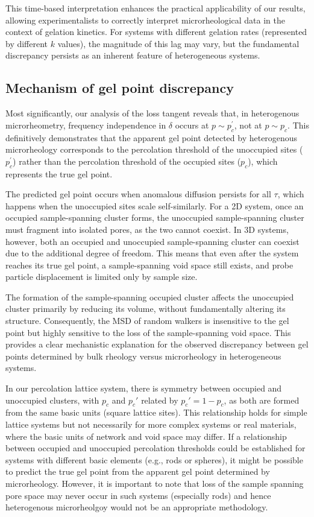 \documentclass[%
 aip,
 amsmath,amssymb,
reprint, onecolumn %
]{revtex4-1}
\begin{document}
This time-based interpretation enhances the practical applicability of our results, allowing experimentalists to correctly interpret microrheological data in the context of gelation kinetics. For systems with different gelation rates (represented by different $k$ values), the magnitude of this lag may vary, but the fundamental discrepancy persists as an inherent feature of heterogeneous systems.

\subsection{Mechanism of gel point discrepancy}

Most significantly, our analysis of the loss tangent reveals that, in heterogenous microrheometry, frequency independence in $\delta$ occurs at $p \sim p_{c}^{'}$, not at $p \sim p_{c}$. This definitively demonstrates that the apparent gel point detected by heterogenous microrheology corresponds to the percolation threshold of the unoccupied sites ($p_{c}^{'}$) rather than the percolation threshold of the occupied sites ($p_{c}$), which represents the true gel point.

The predicted gel point occurs when anomalous diffusion persists for all $\tau$, which happens when the unoccupied sites scale self-similarly. For a 2D system, once an occupied sample-spanning cluster forms, the unoccupied sample-spanning cluster must fragment into isolated pores, as the two cannot coexist. In 3D systems, however, both an occupied and unoccupied sample-spanning cluster can coexist due to the additional degree of freedom. This means that even after the system reaches its true gel point, a sample-spanning void space still exists, and probe particle displacement is limited only by sample size.

The formation of the sample-spanning occupied cluster affects the unoccupied cluster primarily by reducing its volume, without fundamentally altering its structure. Consequently, the MSD of random walkers is insensitive to the gel point but highly sensitive to the loss of the sample-spanning void space. This provides a clear mechanistic explanation for the observed discrepancy between gel points determined by bulk rheology versus microrheology in heterogeneous systems.

In our percolation lattice system, there is symmetry between occupied and unoccupied clusters, with $p_c$ and $p_c'$ related by $p_c' = 1 - p_c$, as both are formed from the same basic units (square lattice sites). This relationship holds for simple lattice systems but not necessarily for more complex systems or real materials, where the basic units of network and void space may differ. If a relationship between occupied and unoccupied percolation thresholds could be established for systems with different basic elements (e.g., rods or spheres), it might be possible to predict the true gel point from the apparent gel point determined by microrheology. However, it is important to note that loss of the sample spanning pore space may never occur in such systems (especially rods) and hence heterogenous microrheolgoy would not be an appropriate methodology. 
\end{document}
